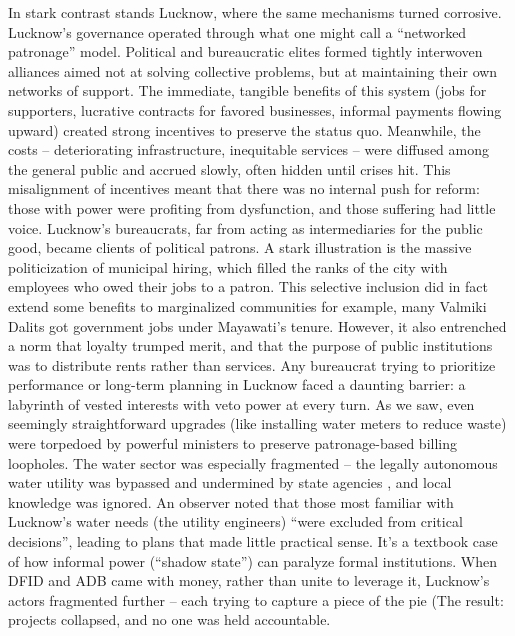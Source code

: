In stark contrast stands Lucknow, where the same mechanisms turned corrosive. Lucknow's governance operated through what one might call a ``networked patronage'' model. Political and bureaucratic elites formed tightly interwoven alliances aimed not at solving collective problems, but at maintaining their own networks of support. The immediate, tangible benefits of this system (jobs for supporters, lucrative contracts for favored businesses, informal payments flowing upward) created strong incentives to preserve the status quo. Meanwhile, the costs – deteriorating infrastructure, inequitable services – were diffused among the general public and accrued slowly, often hidden until crises hit. This misalignment of incentives meant that there was no internal push for reform: those with power were profiting from dysfunction, and those suffering had little voice. Lucknow's bureaucrats, far from acting as intermediaries for the public good, became clients of political patrons. A stark illustration is the massive politicization of municipal hiring, which filled the ranks of the city with employees who owed their jobs to a patron. This selective inclusion did in fact extend some benefits to marginalized communities for example, many Valmiki Dalits got government jobs under Mayawati's tenure. However, it also entrenched a norm that loyalty trumped merit, and that the purpose of public institutions was to distribute rents rather than services. Any bureaucrat trying to prioritize performance or long-term planning in Lucknow faced a daunting barrier: a labyrinth of vested interests with veto power at every turn. As we saw, even seemingly straightforward upgrades (like installing water meters to reduce waste) were torpedoed by powerful ministers to preserve patronage-based billing loopholes. The water sector was especially fragmented – the legally autonomous water utility was bypassed and undermined by state agencies , and local knowledge was ignored. An observer noted that those most familiar with Lucknow's water needs (the utility engineers) ``were excluded from critical decisions'', leading to plans that made little practical sense. It's a textbook case of how informal power (``shadow state'') can paralyze formal institutions. When DFID and ADB came with money, rather than unite to leverage it, Lucknow's actors fragmented further – each trying to capture a piece of the pie (The result: projects collapsed, and no one was held accountable.

